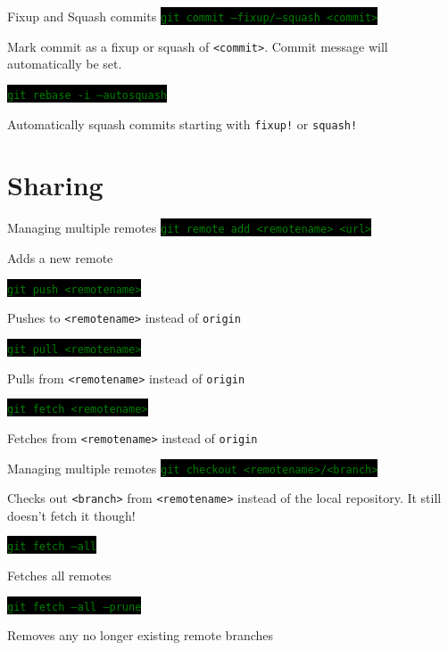 \documentclass[
14pt,
aspectratio=169,
usenames,
dvipsnames,
x11names]{beamer}
\newcommand{\code}[1]{{\small\colorbox{black}{\textcolor{green}{\texttt{#1}}}}}
\begin{document}
\begin{frame}{Fixup and Squash commits}
    \code{git commit --fixup/--squash <commit>}

    Mark commit as a fixup or squash of \texttt{<commit>}.
    Commit message will automatically be set.

    \vfill
    \pause

    \code{git rebase -i --autosquash}

    Automatically squash commits starting with \texttt{fixup!} or \texttt{squash!}
\end{frame}

\section{Sharing}

\begin{frame}{Managing multiple remotes}
  \code{git remote add <remotename> <url>}

  Adds a new remote

  \vfill
  \pause

  \code{git push <remotename>}

  Pushes to \texttt{<remotename>} instead of \texttt{origin}

  \vfill
  \pause

  \code{git pull <remotename>}

  Pulls from \texttt{<remotename>} instead of \texttt{origin}

  \vfill
  \pause

  \code{git fetch <remotename>}

  Fetches from \texttt{<remotename>} instead of \texttt{origin}

\end{frame}

\begin{frame}{Managing multiple remotes}
  \code{git checkout <remotename>/<branch>}

  Checks out \texttt{<branch>} from \texttt{<remotename>} instead of the local repository.
  It still \alert{doesn't fetch it} though!

  \vfill
  \pause

  \code{git fetch --all}

  Fetches all remotes

  \vfill
  \pause

  \code{git fetch --all --prune}

  Removes any no longer existing remote branches

\end{frame}
\end{document}
